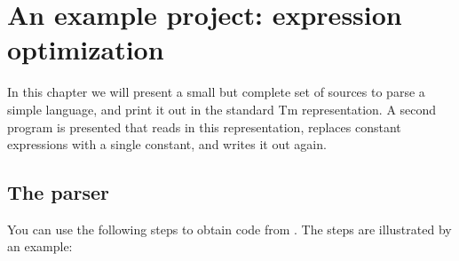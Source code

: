 \chapter{An example project: expression optimization}
\label{s.calc}
In this chapter we will present a small but complete set of sources to parse
a simple language, and print it out in the standard Tm representation.
A second program is presented that reads in this representation,
replaces constant expressions with a single constant, and writes
it out again.

\section{The parser}
\label{s.calcparser}
You can use the following steps to obtain {\C} code from {\Tm}.
The steps are illustrated by an example:
